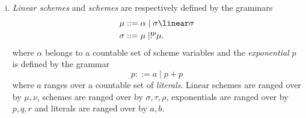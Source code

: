 \begin{defi}\hfill
\begin{enumerate}[i)]
\item\emph{Linear schemes} and \emph{schemes} are
  respectively defined by the grammars
\begin{align*}
  \mu & ::=\alpha \mid \sigma \linear \sigma\\
  \sigma &::= \mu \mid !^p\mu.
\end{align*}
where $\alpha$ belongs to a countable set of scheme variables and the \emph{exponential} $p$  
is defined by the grammar
\begin{displaymath}
 p::= a \mid p+p  
  \end{displaymath}
  where $a$ ranges over a countable set of \emph{literals}.
 Linear schemes are
  ranged over by $\mu, \nu$, schemes are ranged over by $\sigma,
  \tau, \rho$, exponentials are ranged over by $p,q,r$ and literals are ranged over by $a,b$.
  

\end{enumerate}
\end{defi}
